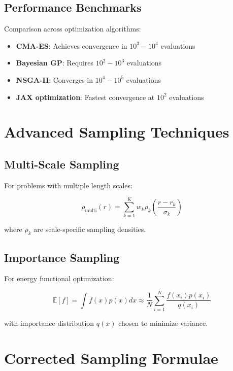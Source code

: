 \documentclass[12pt,a4paper]{article}
\begin{document}
\subsection{Performance Benchmarks}

Comparison across optimization algorithms:

\begin{itemize}
\item \textbf{CMA-ES}: Achieves convergence in $10^3-10^4$ evaluations
\item \textbf{Bayesian GP}: Requires $10^2-10^3$ evaluations
\item \textbf{NSGA-II}: Converges in $10^4-10^5$ evaluations
\item \textbf{JAX optimization}: Fastest convergence at $10^2$ evaluations
\end{itemize}

\section{Advanced Sampling Techniques}

\subsection{Multi-Scale Sampling}

For problems with multiple length scales:

\begin{equation}
\rho_{\text{multi}}(r) = \sum_{k=1}^K w_k \rho_k\left(\frac{r - r_k}{\sigma_k}\right)
\end{equation}

where $\rho_k$ are scale-specific sampling densities.

\subsection{Importance Sampling}

For energy functional optimization:

\begin{equation}
\mathbb{E}[f] = \int f(x) p(x) dx \approx \frac{1}{N} \sum_{i=1}^N \frac{f(x_i) p(x_i)}{q(x_i)}
\end{equation}

with importance distribution $q(x)$ chosen to minimize variance.

\section{Corrected Sampling Formulae}
\end{document}
